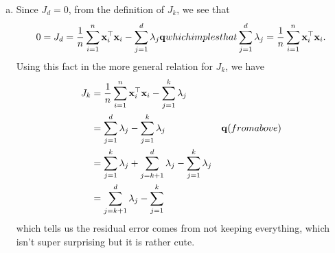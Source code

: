 \documentclass[12pt,letterpaper,fleqn]{hmcpset}
\begin{document}
\begin{solution}
\begin{enumerate}[(a)]
    \item Since $J_d = 0$, from the definition of $J_k$, we see that
    \begin{align*}
    0 = J_d = \frac{1}{n}\sum_{i=1}^n {\bf x}_i^\top {\bf x}_i  -  \sum_{j=1}^d \lambda_j {\bf q}{which imples that} \sum_{j=1}^d \lambda_j = \frac{1}{n}\sum_{i=1}^n {\bf x}_i^\top {\bf x}_i.
    \end{align*}
    Using this fact in the more general relation for $J_k$, we have
    \begin{align*}
    J_k &= \frac{1}{n}\sum_{i=1}^n {\bf x}_i^\top {\bf x}_i  -  \sum_{j=1}^k \lambda_j \\
    &= \sum_{j=1}^d \lambda_j  -  \sum_{j=1}^k \lambda_j  &{\bf q}{(from above)} \\
    &= \sum_{j=1}^k \lambda_j + \sum_{j=k+1}^d \lambda_j  -  \sum_{j=1}^k \lambda_j \\
    &= \sum_{j=k+1}^d \lambda_j  -  \sum_{j=1}^k
    \end{align*}
    which tells us the residual error comes from not keeping everything, which isn't super surprising but it is rather cute.
    
\end{enumerate}
\end{solution}
\newpage
\end{document}
